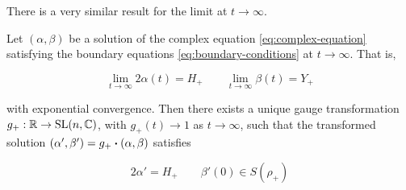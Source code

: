 \documentclass{report}
\begin{document}
There is a very similar result for the limit at \(t \to \infty\).

\begin{lemma}
    \label{lem:complex-trajectory-convergence-positive}

    Let \((\alpha, \beta)\) be a solution of the complex equation \cref{eq:complex-equation} satisfying the boundary equations \cref{eq:boundary-conditions} at \(t \to \infty\). That is,

    \[\lim_{t \to \infty}2\alpha(t) = H_+ \qquad \lim_{t \to \infty}\beta(t) = Y_+\]

    with exponential convergence. Then there exists a unique gauge transformation \(g_+ : \mathbb{R} \to \operatorname{SL}(n, \mathbb{C})\), with \(g_+(t) \to 1\) as \(t \to \infty\), such that the transformed solution \((\alpha', \beta') = g_+ \vdot (\alpha, \beta)\) satisfies

    \[2\alpha' = H_+ \qquad \beta'(0) \in S(\rho_+)\]
\end{lemma}
\end{document}
